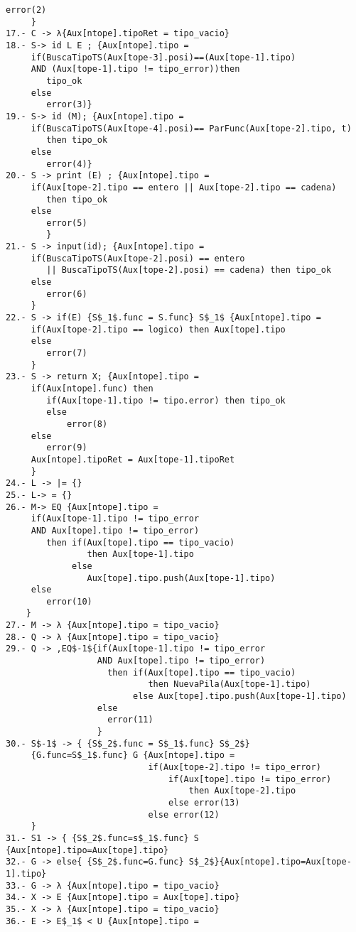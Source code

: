 \documentclass[a4paper, 12pt]{article}
\begin{document}
\begin{lstlisting}[style=EstadosAutomataST]
            error(2)
     }
17.- C -> λ{Aux[ntope].tipoRet = tipo_vacio}
18.- S-> id L E ; {Aux[ntope].tipo =
     if(BuscaTipoTS(Aux[tope-3].posi)==(Aux[tope-1].tipo)
     AND (Aux[tope-1].tipo != tipo_error))then
        tipo_ok
     else
        error(3)}
19.- S-> id (M); {Aux[ntope].tipo =
     if(BuscaTipoTS(Aux[tope-4].posi)== ParFunc(Aux[tope-2].tipo, t)
        then tipo_ok
     else
        error(4)}
20.- S -> print (E) ; {Aux[ntope].tipo =
     if(Aux[tope-2].tipo == entero || Aux[tope-2].tipo == cadena)
        then tipo_ok
     else
        error(5)
        }
21.- S -> input(id); {Aux[ntope].tipo =
     if(BuscaTipoTS(Aux[tope-2].posi) == entero
        || BuscaTipoTS(Aux[tope-2].posi) == cadena) then tipo_ok
     else
        error(6)
     }
22.- S -> if(E) {S$_1$.func = S.func} S$_1$ {Aux[ntope].tipo =
     if(Aux[tope-2].tipo == logico) then Aux[tope].tipo
     else
        error(7)
     }
23.- S -> return X; {Aux[ntope].tipo =
     if(Aux[ntope].func) then
        if(Aux[tope-1].tipo != tipo.error) then tipo_ok
        else
            error(8)
     else
        error(9)
     Aux[ntope].tipoRet = Aux[tope-1].tipoRet
     }
24.- L -> |= {}
25.- L-> = {}
26.- M-> EQ {Aux[ntope].tipo =
     if(Aux[tope-1].tipo != tipo_error
     AND Aux[tope].tipo != tipo_error)
        then if(Aux[tope].tipo == tipo_vacio)
                then Aux[tope-1].tipo
             else
                Aux[tope].tipo.push(Aux[tope-1].tipo)
     else
        error(10)
    }
27.- M -> λ {Aux[ntope].tipo = tipo_vacio}
28.- Q -> λ {Aux[ntope].tipo = tipo_vacio}
29.- Q -> ,EQ$-1${if(Aux[tope-1].tipo != tipo_error
                  AND Aux[tope].tipo != tipo_error)
                    then if(Aux[tope].tipo == tipo_vacio)
                            then NuevaPila(Aux[tope-1].tipo)
                         else Aux[tope].tipo.push(Aux[tope-1].tipo)
                  else
                    error(11)
                  }
30.- S$-1$ -> { {S$_2$.func = S$_1$.func} S$_2$}
     {G.func=S$_1$.func} G {Aux[ntope].tipo =
                            if(Aux[tope-2].tipo != tipo_error)
                                if(Aux[tope].tipo != tipo_error)
                                    then Aux[tope-2].tipo
                                else error(13)
                            else error(12)
     }
31.- S1 -> { {S$_2$.func=s$_1$.func} S {Aux[ntope].tipo=Aux[tope].tipo}
32.- G -> else{ {S$_2$.func=G.func} S$_2$}{Aux[ntope].tipo=Aux[tope-1].tipo}
33.- G -> λ {Aux[ntope].tipo = tipo_vacio}
34.- X -> E {Aux[ntope].tipo = Aux[tope].tipo}
35.- X -> λ {Aux[ntope].tipo = tipo_vacio}
36.- E -> E$_1$ < U {Aux[ntope].tipo =

\end{lstlisting}
\end{document}
